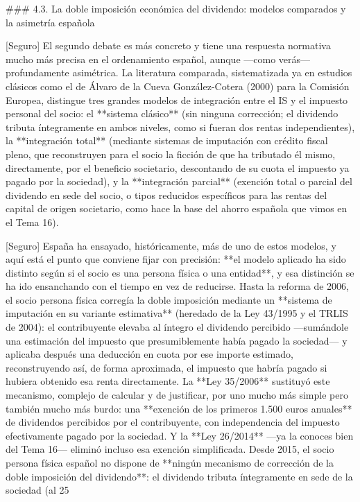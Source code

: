 \documentclass[10pt,a4paper]{article}
\begin{document}
### 4.3. La doble imposición económica del dividendo: modelos comparados y la asimetría española

[Seguro] El segundo debate es más concreto y tiene una respuesta normativa mucho más precisa en el ordenamiento español, aunque —como verás— profundamente asimétrica. La literatura comparada, sistematizada ya en estudios clásicos como el de Álvaro de la Cueva González-Cotera (2000) para la Comisión Europea, distingue tres grandes modelos de integración entre el IS y el impuesto personal del socio: el **sistema clásico** (sin ninguna corrección; el dividendo tributa íntegramente en ambos niveles, como si fueran dos rentas independientes), la **integración total** (mediante sistemas de imputación con crédito fiscal pleno, que reconstruyen para el socio la ficción de que ha tributado él mismo, directamente, por el beneficio societario, descontando de su cuota el impuesto ya pagado por la sociedad), y la **integración parcial** (exención total o parcial del dividendo en sede del socio, o tipos reducidos específicos para las rentas del capital de origen societario, como hace la base del ahorro española que vimos en el Tema 16).

[Seguro] España ha ensayado, históricamente, más de uno de estos modelos, y aquí está el punto que conviene fijar con precisión: **el modelo aplicado ha sido distinto según si el socio es una persona física o una entidad**, y esa distinción se ha ido ensanchando con el tiempo en vez de reducirse. Hasta la reforma de 2006, el socio persona física corregía la doble imposición mediante un **sistema de imputación en su variante estimativa** (heredado de la Ley 43/1995 y el TRLIS de 2004): el contribuyente elevaba al íntegro el dividendo percibido —sumándole una estimación del impuesto que presumiblemente había pagado la sociedad— y aplicaba después una deducción en cuota por ese importe estimado, reconstruyendo así, de forma aproximada, el impuesto que habría pagado si hubiera obtenido esa renta directamente. La **Ley 35/2006** sustituyó este mecanismo, complejo de calcular y de justificar, por uno mucho más simple pero también mucho más burdo: una **exención de los primeros 1.500 euros anuales** de dividendos percibidos por el contribuyente, con independencia del impuesto efectivamente pagado por la sociedad. Y la **Ley 26/2014** —ya la conoces bien del Tema 16— eliminó incluso esa exención simplificada. Desde 2015, el socio persona física español no dispone de **ningún mecanismo de corrección de la doble imposición del dividendo**: el dividendo tributa íntegramente en sede de la sociedad (al 25%
\end{document}
